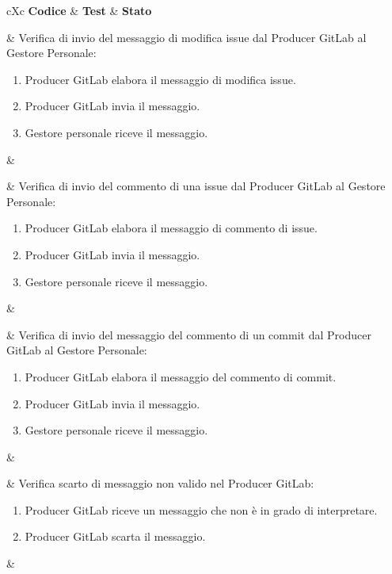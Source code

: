 \begin{table}[H]
	\begin{VTtable}[1.7]{\textwidth}{cXc}
		\rowcolor{\tablegray}
		\textbf{Codice} & \centering\textbf{Test} & \textbf{Stato} \\\toprule

         \addtotv & Verifica di invio del messaggio di modifica issue dal Producer GitLab al Gestore Personale:
        \begin{enumerate}
            \item Producer GitLab elabora il messaggio di modifica issue.
            \item Producer GitLab invia il messaggio.
            \item Gestore personale riceve il messaggio.
        \end{enumerate}
        & \TNI \\\midrule

        \addtotv & Verifica di invio del commento di una issue dal Producer GitLab al Gestore Personale:
        \begin{enumerate}
            \item Producer GitLab elabora il messaggio di commento di issue.
            \item Producer GitLab invia il messaggio.
            \item Gestore personale riceve il messaggio.
        \end{enumerate}
        & \TNI \\\midrule

        \addtotv & Verifica di invio del messaggio del commento di un commit dal Producer GitLab al Gestore Personale:
        \begin{enumerate}
            \item Producer GitLab elabora il messaggio del commento di commit.
            \item Producer GitLab invia il messaggio.
            \item Gestore personale riceve il messaggio.
        \end{enumerate}
        & \TNI \\\midrule

        \addtotv & Verifica scarto di messaggio non valido nel Producer GitLab:
        \begin{enumerate}
            \item Producer GitLab riceve un messaggio che non è in grado di interpretare.
            \item Producer GitLab scarta il messaggio.
        \end{enumerate}
        & \TNI \\\midrule


\end{VTtable}
\end{table}
